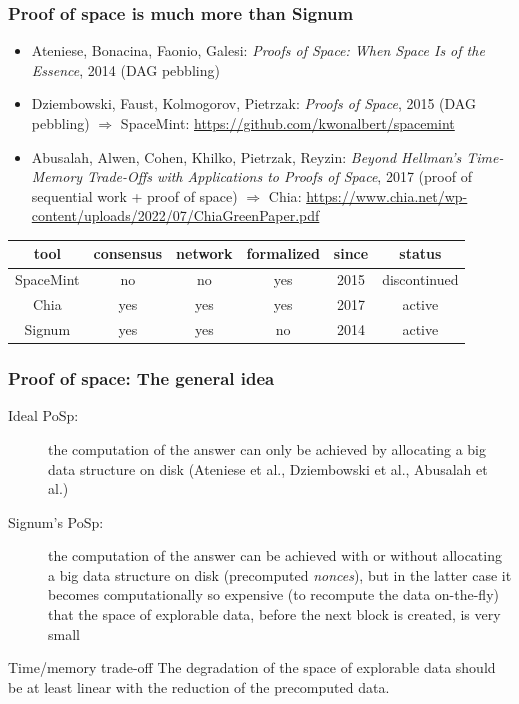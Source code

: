 \documentclass[11pt]{beamer}  %
\begin{document}
\begin{frame}\frametitle{Proof of space is much more than Signum}

  \begin{greenbox}{}
    \begin{itemize}
    \item Ateniese, Bonacina, Faonio, Galesi: \emph{Proofs of Space: When Space Is of the Essence}, 2014 (DAG pebbling)
    \item Dziembowski, Faust, Kolmogorov, Pietrzak: \emph{Proofs of Space}, 2015 (DAG pebbling) $\Rightarrow$
      {\color{red}SpaceMint}: \url{https://github.com/kwonalbert/spacemint}
    \item Abusalah, Alwen, Cohen, Khilko, Pietrzak, Reyzin: \emph{Beyond Hellman's Time-Memory Trade-Offs with Applications to Proofs of Space}, 2017 (proof of sequential work + proof of space) $\Rightarrow$ {\color{red}Chia}: \url{https://www.chia.net/wp-content/uploads/2022/07/ChiaGreenPaper.pdf}
    \end{itemize}

  \begin{center}
    {\small\begin{tabular}{c|c|c|c|c|c}
      tool & consensus & network & formalized & since & status \\\hline\hline
      SpaceMint & no & no & yes & 2015 & discontinued\\\hline
      Chia & yes & yes & yes & 2017 & active\\\hline
      Signum & yes & yes & no & 2014 & active\\\hline
    \end{tabular}}
  \end{center}
  \end{greenbox}
  
\end{frame}

\begin{frame}\frametitle{Proof of space: The general idea}

  \begin{description}
  \item[Ideal PoSp:] the computation of the answer can only be achieved by allocating
    a big data structure on disk (Ateniese et al., Dziembowski et al., Abusalah et al.)
    \medskip
  \item[Signum's PoSp:] the computation of the answer can be achieved with or without
    allocating a big data structure on disk (precomputed \emph{nonces}),
    but in the latter case it becomes
    computationally so expensive (to recompute the data on-the-fly)
    that the space of explorable data, before the next block is created, is very small
  \end{description}

  \bigskip
  
  \begin{redbox}{Time/memory trade-off}
    The degradation of the space of explorable data should be at least linear with
    the reduction of the precomputed data.
  \end{redbox}

\end{frame}
\end{document}
